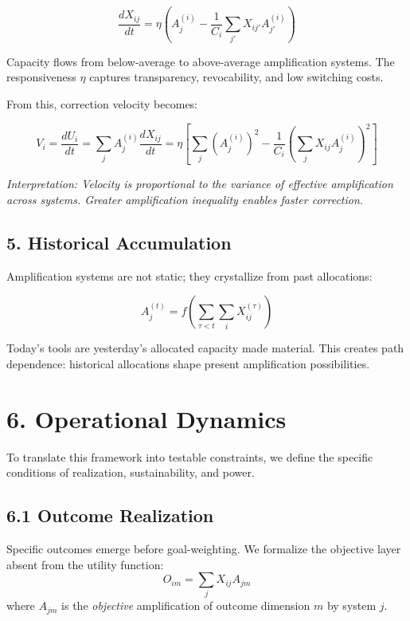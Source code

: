 \documentclass{article}
\begin{document}
\begin{equation}
\frac{dX_{ij}}{dt} = \eta \left( A_j^{(i)} - \frac{1}{C_i} \sum_{j'} X_{ij'} A_{j'}^{(i)} \right)
\end{equation}

Capacity flows from below-average to above-average amplification systems. The responsiveness $\eta$ captures transparency, revocability, and low switching costs.

From this, correction velocity becomes:

\begin{equation}
V_i = \frac{dU_i}{dt} = \sum_j A_j^{(i)} \frac{dX_{ij}}{dt} 
    = \eta \left[ \sum_j (A_j^{(i)})^2 - \frac{1}{C_i} \left( \sum_j X_{ij} A_j^{(i)} \right)^2 \right]
\end{equation}

\textit{Interpretation: Velocity is proportional to the variance of effective amplification across systems. Greater amplification inequality enables faster correction.}

\subsection*{5. Historical Accumulation}

Amplification systems are not static; they crystallize from past allocations:

\begin{equation}
A_j^{(t)} = f\left( \sum_{\tau < t} \sum_i X_{ij}^{(\tau)} \right)
\end{equation}

Today's tools are yesterday's allocated capacity made material. This creates path dependence: historical allocations shape present amplification possibilities.

\section*{6. Operational Dynamics}

To translate this framework into testable constraints, we define the specific conditions of realization, sustainability, and power.

\subsection*{6.1 Outcome Realization}
Specific outcomes emerge before goal-weighting. We formalize the objective layer absent from the utility function:
\begin{equation}
O_{im} = \sum_j X_{ij} A_{jm}
\end{equation}
where $A_{jm}$ is the \textit{objective} amplification of outcome dimension $m$ by system $j$.
\end{document}
